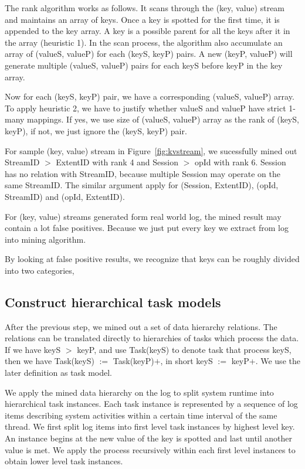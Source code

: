 The rank algorithm works as follows. It scans through the
(key, value) stream and maintains an array of keys. Once a
key is spotted for the first time, it is appended to the key
array. A key is a possible parent for all the keys after it
in the array (heuristic 1). In the scan process, the algorithm also
accumulate an array of (valueS, valueP) for each (keyS, keyP)
pairs. A new (keyP, valueP) will generate multiple (valueS,
valueP) pairs for each keyS before keyP in the key array.

Now for each (keyS, keyP) pair, we have a corresponding
(valueS, valueP) array. To apply heuristic 2, we have to
justify whether valueS and valueP have strict 1-many
mappings. If yes, we use size of (valueS, valueP) array
as the rank of (keyS, keyP), if not, we just ignore the
(keyS, keyP) pair.


For sample (key, value) stream in Figure~\ref{fig:kvstream},
we sucessfully mined out StreamID $>$ ExtentID with rank 4
and Session $>$ opId with rank 6. Session has no relation
with StreamID, because multiple Session may operate on the
same StreamID. The similar argument apply for (Session,
ExtentID), (opId, StreamID) and (opId, ExtentID).

For (key, value) streams generated form real world log, the
mined result may contain a lot false positives. Because we
just put every key we extract from log into mining
algorithm.

By looking at false positive results, we recognize that keys
can be roughly divided into two categories, 

\subsection{Construct hierarchical task models}

After the previous step, we mined out a set of data
hierarchy relations. The relations can be translated
directly to hierarchies of tasks which process the data.
If we have keyS $>$ keyP, and use Task(keyS) to denote task
that process keyS, then we have Task(keyS) $:=$
Task(keyP)$+$, in short keyS $:=$ keyP+. We use the later
definition as task model.

We apply the mined data hierarchy on the log to split system
runtime into hierarchical task instances. Each task instance
is represented by a sequence of log items describing system
activities within a certain time interval of the same
thread. We first split log items into first level task
instances by highest level key. An instance begins at the
new value of the key is spotted and last until another value
is met. We apply the process recursively within each first
level instances to obtain lower level task instances.

